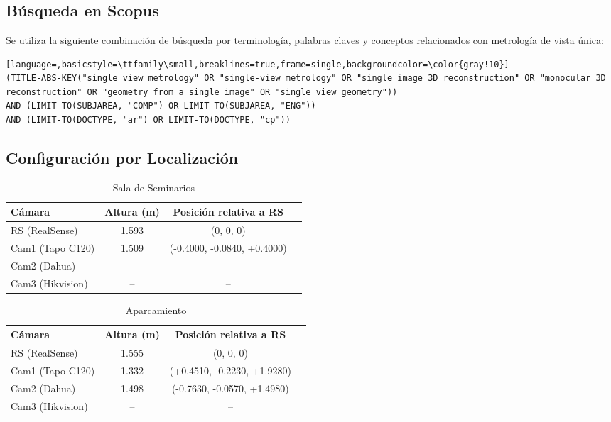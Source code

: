 \chapter{}
\section{Búsqueda en Scopus}
Se utiliza la siguiente combinación de búsqueda por terminología, palabras claves y conceptos relacionados con metrología de vista única:
\begin{lstlisting}[language=,basicstyle=\ttfamily\small,breaklines=true,frame=single,backgroundcolor=\color{gray!10}]
(TITLE-ABS-KEY("single view metrology" OR "single-view metrology" OR "single image 3D reconstruction" OR "monocular 3D reconstruction" OR "geometry from a single image" OR "single view geometry"))
AND (LIMIT-TO(SUBJAREA, "COMP") OR LIMIT-TO(SUBJAREA, "ENG"))
AND (LIMIT-TO(DOCTYPE, "ar") OR LIMIT-TO(DOCTYPE, "cp"))
\end{lstlisting}

\section{Configuración por Localización}\label{app:LocationConfig}
\begin{table}[htp]
\scriptsize
\centering
\begin{tabular}{lccc}
\hline
\textbf{Cámara} & \textbf{Altura (m)} & \textbf{Posición relativa a RS} \\
\hline
RS (RealSense) & 1.593 & (0, 0, 0) \\
Cam1 (Tapo C120) & 1.509 & (-0.4000, -0.0840, +0.4000) \\
Cam2 (Dahua) & -- & -- \\
Cam3 (Hikvision) & -- & -- \\
\hline
\end{tabular}
\caption{Sala de Seminarios}\label{tab:SeminarRoom}
\end{table}

\begin{table}[htp]
\centering
\scriptsize
\begin{tabular}{lccc}
\hline
\textbf{Cámara} & \textbf{Altura (m)} & \textbf{Posición relativa a RS} \\
\hline
RS (RealSense) & 1.555 & (0, 0, 0) \\
Cam1 (Tapo C120) & 1.332 & (+0.4510, -0.2230, +1.9280) \\
Cam2 (Dahua) & 1.498 & (-0.7630, -0.0570, +1.4980) \\
Cam3 (Hikvision) & -- & -- \\
\hline
\end{tabular}
\caption{Aparcamiento}\label{tab:ParkingLot}
\end{table}

